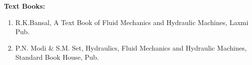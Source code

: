 \documentclass[12pt, a4paper]{article}
\begin{document}
                                                                                                                                                                                                                                                                                                                                                                                                            \vspace{0.5cm}
                                                                                                                                                                                                                                                                                                                                                                                                            \noindent \textbf{Text Books:}
                                                                                                                                                                                                                                                                                                                                                                                                            \begin{enumerate}[label=\arabic*., leftmargin=*]
                                                                                                                                                                                                                                                                                                                                                                                                                \item R.K.Bansal, A Text Book of Fluid Mechanics and Hydraulic Machines, Laxmi  Pub.
                                                                                                                                                                                                                                                                                                                                                                                                                    \item P.N. Modi \& S.M. Set, Hydraulics, Fluid Mechanics and Hydraulic Machines, Standard Book House, Pub.
                                                                                                                                                                                                                                                                                                                                                                                                                    \end{enumerate}
\end{document}
